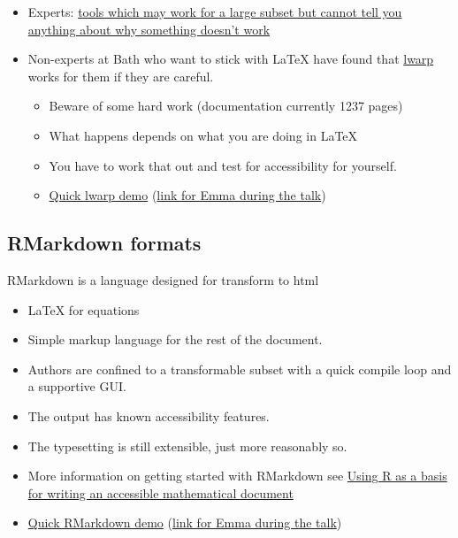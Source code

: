 \documentclass[
  10pt,
  a4paper]{article}
\providecommand{\tightlist}{%
  \setlength{\itemsep}{0pt}\setlength{\parskip}{0pt}}
\theoremstyle{plain}
\theoremstyle{plain}
\theoremstyle{plain}
\theoremstyle{plain}
\theoremstyle{plain}
\theoremstyle{definition}
\theoremstyle{definition}
\theoremstyle{definition}
\theoremstyle{remark}
\begin{document}
\begin{itemize}
\tightlist
\item
  Experts: \href{https://hub.docker.com/r/bathmash/mathaltnotes}{tools which may work for a large subset but cannot tell you anything about why something doesn't work}
\item
  Non-experts at Bath who want to stick with LaTeX have found that \href{https://ctan.org/pkg/lwarp?lang=en}{lwarp} works for them if they are careful.

  \begin{itemize}
  \tightlist
  \item
    Beware of some hard work (documentation currently 1237 pages)
  \item
    What happens depends on what you are doing in LaTeX
  \item
    You have to work that out and test for accessibility for yourself.
  \item
    \href{https://github.com/STEM-Enable/Getting-started-with-accessible-maths-March-2023/raw/main/example/LwarpExample.zip}{Quick lwarp demo} (\href{https://posit.cloud/content/5657619}{link for Emma during the talk})
  \end{itemize}
\end{itemize}

\hypertarget{rmarkdown-formats}{%
\subsection{RMarkdown formats}\label{rmarkdown-formats}}

RMarkdown is a language designed for transform to html

\begin{itemize}
\tightlist
\item
  LaTeX for equations
\item
  Simple markup language for the rest of the document.
\item
  Authors are confined to a transformable subset with a quick compile loop and a supportive GUI.
\item
  The output has known accessibility features.
\item
  The typesetting is still extensible, just more reasonably so.
\item
  More information on getting started with RMarkdown see \href{https://stem-enable.github.io/RMarkdownWorkshop/}{Using R as a basis for writing an accessible mathematical document}
\item
  \href{https://github.com/STEM-Enable/RMarkdownWorkshop/raw/master/examples/arclengthInR.zip}{Quick RMarkdown demo} (\href{https://posit.cloud/content/4447915}{link for Emma during the talk})
\end{itemize}
\end{document}
